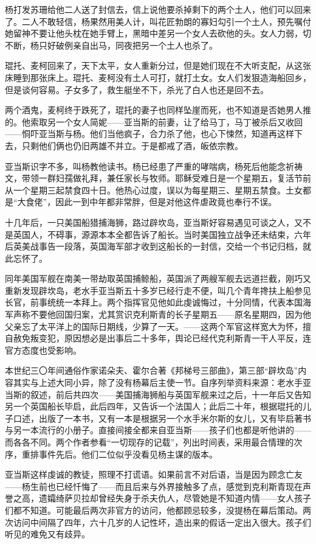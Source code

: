 \par 杨打发苏珊给他二人送了封信去，信上说他要杀掉剩下的两个土人，他们可以回来了。二人不敢轻信，杨果然用美人计，叫花匠勃朗的寡妇勾引一个土人，预先嘱付她留神不要让他头枕在她手臂上，黑暗中差另一个女人去砍他的头。女人力弱，切不断，杨只好破例亲自出马，同夜把另一个土人也杀了。
\par 琨托、麦柯回来了，天下太平，女人重新分过，但是她们现在不大听支配，从这张床睡到那张床上。琨托、麦柯没有土人可打，就打土女。女人们发狠造海船回乡，但是谈何容易。子女多了，救生艇坐不下，杀光了白人也还是回不去。
\par 两个酒鬼，麦柯终于跌死了，琨托的妻子也同样坠崖而死，也不知道是否她男人推的。他索取另一个女人简妮——亚当斯的前妻，让了给马丁，马丁被杀后又收回——恫吓亚当斯与杨。他们当他疯子，合力杀了他，也心下悚然，知道再这样下去，只剩他们俩也仍旧两雄不并立。于是都戒了酒，皈依宗教。
\par 亚当斯识字不多，叫杨教他读书。杨已经患了严重的哮喘病，杨死后他能念祈祷文，带领一群妇孺做礼拜，兼任家长与牧师。耶稣受难日是一个星期五，复活节前从一个星期三起禁食四十日。他热心过度，误以为每星期三、星期五禁食。土女都是“大食佬”，因此一到中年都非常胖，但是对他这件虐政竟也奉行不误。
\par 十几年后，一只美国船猎捕海狮，路过辟坎岛，亚当斯好容易遇见可谈之人，又不是英国人，不碍事，源源本本全都告诉了船长。当时美国独立战争还未结束，六年后英美战事告一段落，英国海军部才收到这船长的一封信，交给一个书记归档，就此忘怀了。
\par 同年美国军舰在南美一带劫取英国捕鲸船，英国派了两艘军舰去远道拦截，刚巧又重新发现辟坎岛，老水手亚当斯五十多岁已经行走不便，叫几个青年搀扶上船参见长官，前事统统一本拜上。两个指挥官见他如此虔诚悔过，十分同情，代表本国海军声称不要他回国归案，尤其赏识克利斯青的长子星期五——原名星期四，因为他父亲忘了太平洋上的国际日期线，少算了一天。——这两个军官这样宽大为怀，擅自赦免叛变犯，原因想必是出事后二十多年，舆论已经代克利斯青一干人平反，连官方态度也受影响。
\par 本世纪三〇年间通俗作家诺朵夫、霍尔合著《邦梯号三部曲》，第三部“辟坎岛”内容其实与上述大同小异，除了没有杨幕后主使一节。自序列举资料来源：老水手亚当斯的叙述，前后共四次——美国捕海狮船与英国军舰来过之后，十一年后又告知另一个英国船长毕启，此后四年，又告诉一个法国人；此后二十年，根据琨托的儿子口述，出版了一本书，又有一本是根据另一个水手米尔斯的女儿，又有毕启著书与另一本流行的小册子。直接间接全都来自亚当斯——孩子们也都是听他讲的——而各各不同。两个作者参看“一切现存的记载”，列出时间表，采用最合情理的次序，重排事件先后。他们二位似乎没看见杨主谋的版本。
\par 亚当斯这样虔诚的教徒，照理不打谎语。如果前言不对后语，当是因为顾念亡友——杨生前也已经忏悔了——而且后来与外界接触多了点，感觉到克利斯青现在声誉之高，遗孀绮萨贝拉却曾经失身于杀夫仇人，尽管她是不知道内情——女人孩子们都不知道。可能最后两次非官方的访问，他都顾忌较多，没提杨在幕后策动。两次访问中间隔了四年，六十几岁的人记性坏，造出来的假话一定出入很大。孩子们听见的难免又有歧异。
